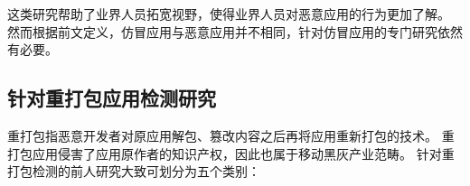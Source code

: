 这类研究帮助了业界人员拓宽视野，使得业界人员对恶意应用的行为更加了解。
然而根据前文定义，仿冒应用与恶意应用并不相同，针对仿冒应用的专门研究依然有必要。

\subsection{针对重打包应用检测研究}
\label{sec:repackaging}
重打包指恶意开发者对原应用解包、篡改内容之后再将应用重新打包的技术。
重打包应用侵害了应用原作者的知识产权，因此也属于移动黑灰产业范畴。
针对重打包检测的前人研究大致可划分为五个类别：

